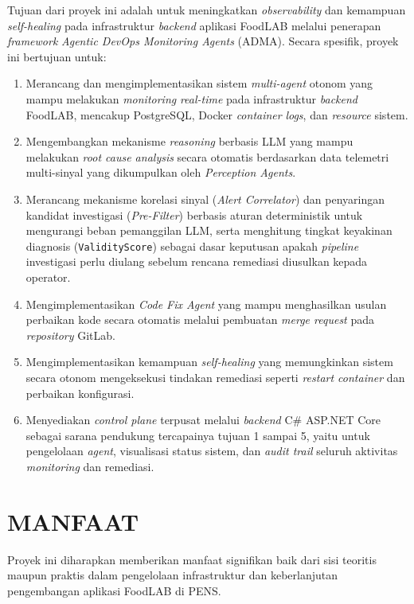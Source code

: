 Tujuan dari proyek ini adalah untuk meningkatkan \textit{observability} dan kemampuan \textit{self-healing} pada infrastruktur \textit{backend} aplikasi FoodLAB melalui penerapan \textit{framework} \textit{Agentic DevOps Monitoring Agents} (ADMA). Secara spesifik, proyek ini bertujuan untuk:

\begin{enumerate}[label=\arabic*., leftmargin=*]
  \item Merancang dan mengimplementasikan sistem \textit{multi-agent} otonom yang mampu melakukan \textit{monitoring} \textit{real-time} pada infrastruktur \textit{backend} FoodLAB, mencakup PostgreSQL, Docker \textit{container} \textit{logs}, dan \textit{resource} sistem.
  \item Mengembangkan mekanisme \textit{reasoning} berbasis LLM yang mampu melakukan \textit{root cause analysis} secara otomatis berdasarkan data telemetri multi-sinyal yang dikumpulkan oleh \textit{Perception Agents}.
  \item Merancang mekanisme korelasi sinyal (\textit{Alert Correlator}) dan penyaringan kandidat investigasi (\textit{Pre-Filter}) berbasis aturan deterministik untuk mengurangi beban pemanggilan LLM, serta menghitung tingkat keyakinan diagnosis (\texttt{ValidityScore}) sebagai dasar keputusan apakah \textit{pipeline} investigasi perlu diulang sebelum rencana remediasi diusulkan kepada operator.
  \item Mengimplementasikan \textit{Code Fix Agent} yang mampu menghasilkan usulan perbaikan kode secara otomatis melalui pembuatan \textit{merge request} pada \textit{repository} GitLab.
  \item Mengimplementasikan kemampuan \textit{self-healing} yang memungkinkan sistem secara otonom mengeksekusi tindakan remediasi seperti \textit{restart container} dan perbaikan konfigurasi.
  \item Menyediakan \textit{control plane} terpusat melalui \textit{backend} C\# ASP.NET Core sebagai sarana pendukung tercapainya tujuan 1 sampai 5, yaitu untuk pengelolaan \textit{agent}, visualisasi status sistem, dan \textit{audit trail} seluruh aktivitas \textit{monitoring} dan remediasi.
\end{enumerate}

\section{MANFAAT}

Proyek ini diharapkan memberikan manfaat signifikan baik dari sisi teoritis maupun praktis dalam pengelolaan infrastruktur dan keberlanjutan pengembangan aplikasi FoodLAB di PENS.

